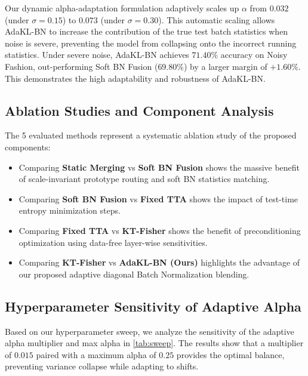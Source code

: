 \documentclass{article}
\begin{document}
Our dynamic alpha-adaptation formulation adaptively scales up $\alpha$ from $0.032$ (under $\sigma = 0.15$) to $0.073$ (under $\sigma = 0.30$). This automatic scaling allows AdaKL-BN to increase the contribution of the true test batch statistics when noise is severe, preventing the model from collapsing onto the incorrect running statistics. Under severe noise, AdaKL-BN achieves $71.40\%$ accuracy on Noisy Fashion, out-performing Soft BN Fusion ($69.80\%$) by a larger margin of $+1.60\%$. This demonstrates the high adaptability and robustness of AdaKL-BN.

\subsection{Ablation Studies and Component Analysis}
The 5 evaluated methods represent a systematic ablation study of the proposed components:
\begin{itemize}
    \item Comparing \textbf{Static Merging} vs \textbf{Soft BN Fusion} shows the massive benefit of scale-invariant prototype routing and soft BN statistics matching.
    \item Comparing \textbf{Soft BN Fusion} vs \textbf{Fixed TTA} shows the impact of test-time entropy minimization steps.
    \item Comparing \textbf{Fixed TTA} vs \textbf{KT-Fisher} shows the benefit of preconditioning optimization using data-free layer-wise sensitivities.
    \item Comparing \textbf{KT-Fisher} vs \textbf{AdaKL-BN (Ours)} highlights the advantage of our proposed adaptive diagonal Batch Normalization blending.
\nobreak
\end{itemize}

\subsection{Hyperparameter Sensitivity of Adaptive Alpha}
Based on our hyperparameter sweep, we analyze the sensitivity of the adaptive alpha multiplier and max alpha in \cref{tab:sweep}. The results show that a multiplier of $0.015$ paired with a maximum alpha of $0.25$ provides the optimal balance, preventing variance collapse while adapting to shifts.
\end{document}
